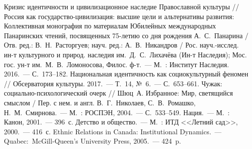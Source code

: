 \begin{thebibliography}{99}
\bibitem{} Кризис идентичности и цивилизационное наследие Православной культуры // Россия как государство-цивилизация: высшие цели и альтернативы развития: Коллективная монография по материалам Юбилейных международных Панаринских чтений, посвященных 75-летию со дня рождения А.~С.~Панарина / Отв. ред.: В.~Н.~Расторгуев; науч. ред.: А.~В.~Никандров / Рос. науч.-исслед. ин-т культурного и природ. наследия им.~Д.~С.~Лихачёва (Ин-т Наследия); Мос. гос. ун-т им.~М.~В.~Ломоносова, Филос. ф-т.~--- М.~: Институт Наследия. 2016.~--- С.~173--182.
\bibitem{} Национальная идентичность как социокультурный феномен // Обсерватория культуры. 2017.~--- Т.~14, №~6.~--- С.~653--661.
\bibitem{} Чужак: социально-психологический очерк // Шюц~А. Избранное: Мир, светящийся смыслом / Пер. с нем. и англ. В.~Г.~Николаев, С.~В.~Ромашко, Н.~М.~Смирнова.~--- М.~: РОСПЭН, 2004.~--- С.~533--549.
\bibitem{} Нация.~--- М.~: Канон, 2001.~--- 396~с.
\bibitem{} Детство и общество.~--- М.~: ИТД <<Летний сад>>, 2000.~--- 416~с.
\bibitem{} Ethnic Relations in Canada: Institutional Dynamics.~--- Quabec:~McGill-Queen's University Press, 2005.~--- 424~p.

\end{thebibliography}
